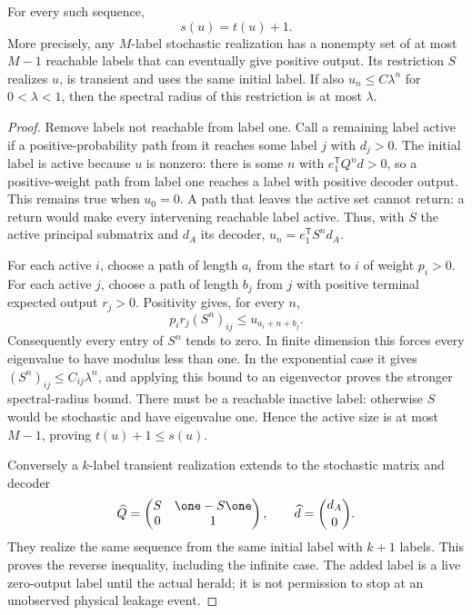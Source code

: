 \begin{lemma}\label{lem:r70-core}
For every such sequence,
\begin{equation}\label{eq:r70-core-count}
 s(u)=t(u)+1.
\end{equation}
More precisely, any $M$-label stochastic realization has a nonempty set of at most $M-1$ reachable labels that can eventually give positive output. Its restriction $S$ realizes $u$, is transient and uses the same initial label. If also $u_n\le C\lambda^n$ for $0<\lambda<1$, then the spectral radius of this restriction is at most $\lambda$.
\end{lemma}
\begin{proof}
Remove labels not reachable from label one. Call a remaining label active if a positive-probability path from it reaches some label $j$ with $d_j>0$. The initial label is active because $u$ is nonzero: there is some $n$ with $e_1^{\mathsf T}Q^nd>0$, so a positive-weight path from label one reaches a label with positive decoder output. This remains true when $u_0=0$. A path that leaves the active set cannot return: a return would make every intervening reachable label active. Thus, with $S$ the active principal submatrix and $d_A$ its decoder, $u_n=e_1^{\mathsf T}S^nd_A$.

For each active $i$, choose a path of length $a_i$ from the start to $i$ of weight $p_i>0$. For each active $j$, choose a path of length $b_j$ from $j$ with positive terminal expected output $r_j>0$. Positivity gives, for every $n$,
\begin{equation}\label{eq:r70-path-bound}
 p_ir_j(S^n)_{ij}\le u_{a_i+n+b_j}.
\end{equation}
Consequently every entry of $S^n$ tends to zero. In finite dimension this forces every eigenvalue to have modulus less than one. In the exponential case it gives $(S^n)_{ij}\le C_{ij}\lambda^n$, and applying this bound to an eigenvector proves the stronger spectral-radius bound. There must be a reachable inactive label: otherwise $S$ would be stochastic and have eigenvalue one. Hence the active size is at most $M-1$, proving $t(u)+1\le s(u)$.

Conversely a $k$-label transient realization extends to the stochastic matrix and decoder
\begin{equation}\label{eq:r70-cemetery}
 \widehat Q=\begin{pmatrix}S&\one-S\one\\0&1\end{pmatrix},
 \qquad \widehat d=\binom{d_A}{0}.
\end{equation}
They realize the same sequence from the same initial label with $k+1$ labels. This proves the reverse inequality, including the infinite case. The added label is a live zero-output label until the actual herald; it is not permission to stop at an unobserved physical leakage event.
\end{proof}

